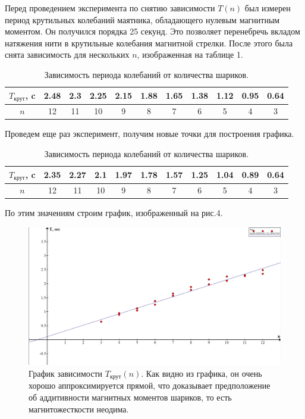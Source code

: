\documentclass[a4paper, 14pt]{extarticle}%
\newcommand\ECaption[1]{%
     \captionsetup{font=footnotesize}%
     \caption{#1}}
\begin{document}
Перед проведением эксперимента по снятию зависимости $T(n)$ был измерен период крутильных колебаний маятника, обладающего нулевым магнитным моментом. Он получился порядка 25 секунд. Это позволяет перенебречь вкладом натяжения нити в крутильные колебания магнитной стрелки. После этого была снята зависимость для нескольких $n$, изображенная на таблице 1.
\begin{table}[h!]
\begin{center}
\begin{tabular}{|c|c|c|c|c|c|c|c|c|c|c|}
\hline
\rowcolor[HTML]{9698ED} 
$T_{\text{крут}}$, c & 2.48 &  2.3 & 2.25 & 2.15 & 1.88 & 1.65 & 1.38 & 1.12 & 0.95 & 0.64 \\ \hline
$n$                  & 12   & 11   & 10    & 9   & 8    & 7    & 6    & 5    & 4    & 3    \\ \hline
\end{tabular}
\ECaption{Зависимость периода колебаний от количества шариков.}
\end{center}
\end{table}

Проведем еще раз эксперимент, получим новые точки для построения графика.

\begin{table}[h!]
\begin{center}
\begin{tabular}{|c|c|c|c|c|c|c|c|c|c|c|}
\hline
\rowcolor[HTML]{9698ED} 
$T_{\text{крут}}$, c & 2.35 &  2.27 & 2.1 & 1.97 & 1.78 & 1.57 & 1.25 & 1.04 & 0.89 & 0.64 \\ \hline
$n$                  & 12   & 11   & 10    & 9   & 8    & 7    & 6    & 5    & 4    & 3    \\ \hline
\end{tabular}
\ECaption{Зависимость периода колебаний от количества шариков.}
\end{center}
\end{table}

По этим значениям строим график, изображенный на рис.4.

\begin{figure}[h!]
\begin{center}
\includegraphics[width=1 \textwidth]{pics/lab1231.png}
\end{center}
\ECaption{График зависимости $T_{\text{крут}}(n)$. Как видно из графика, он очень хорошо аппроксимируется прямой, что доказывает предположение об аддитивности магнитных моментов шариков, то есть магнитожесткости неодима. }
\end{figure}
\end{document}
